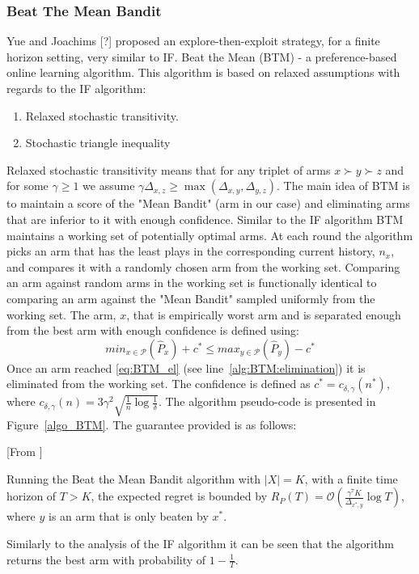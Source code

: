 \documentclass{llncs}
\begin{document}
\subsubsection{Beat The Mean Bandit}
	Yue and Joachims [?] proposed an explore-then-exploit strategy, for a finite horizon setting, very similar to IF. 
	Beat the Mean (BTM) - a preference-based online learning algorithm.
	This algorithm is based on relaxed assumptions with regards to the IF algorithm:
	\begin{enumerate}
		\item Relaxed stochastic transitivity.
		\item Stochastic triangle inequality
	\end{enumerate}
	Relaxed stochastic transitivity means that for any triplet of arms $x \succ y \succ z$ and for some $ \gamma \geq 1 $ we assume $\gamma\Delta_{x,z} \geq  \max(\Delta_{x,y},\Delta_{y,z})$.
	The main idea of BTM is to maintain a score of the "Mean Bandit" (arm in our case) and eliminating arms that are inferior to it with enough confidence.
	Similar to the IF algorithm BTM maintains a working set of potentially optimal arms.
	At each round the algorithm picks an arm that has the least plays in the corresponding current history, $n_x$, and compares it with a randomly chosen arm from the working set.
	Comparing an arm against random arms in the working set is functionally identical to comparing an arm against the "Mean Bandit" sampled uniformly from the working set.
	The arm, $x$,  that is empirically worst arm and is separated enough from the best arm with enough confidence is defined using:
	\begin{equation}\label{eq:BTM_el}
	min_{x\in \mathcal{P}} (\hat{P}_{x})+c^* \leq max_{y \in \mathcal{P}}(\hat{P}_{y})-c^*
\end{equation}	 
	Once an arm reached \eqref{eq:BTM_el} (see line~\ref{alg:BTM:elimination}) it is eliminated from the working set. The confidence is defined as $ c^* = c_{\delta, \gamma}(n^*) $, where $c_{\delta, \gamma}(n) = 3\gamma^2 \sqrt{\frac{1}{n}\log \frac{1}{\delta}}$.
	The algorithm pseudo-code is presented in Figure~\ref{algo_BTM}.	
	The guarantee provided is as follows:
	\begin{theorem}\label{thm:BTM}[From \cite{...}]

		Running the Beat the Mean Bandit algorithm with $|X|=K$, with a finite time horizon of $T>K$, the expected regret is bounded by $R_P(T) = \mathcal{O} \left( \frac{\gamma^7K}{\Delta_{x^*,y}} \log T \right)$, where $y$ is an arm that is only beaten by $x^*$.

	\end{theorem}	
	Similarly to the analysis of the IF algorithm it can be seen that the algorithm returns the best arm with probability of $1-\frac{1}{T}$.	
	
\end{document}
